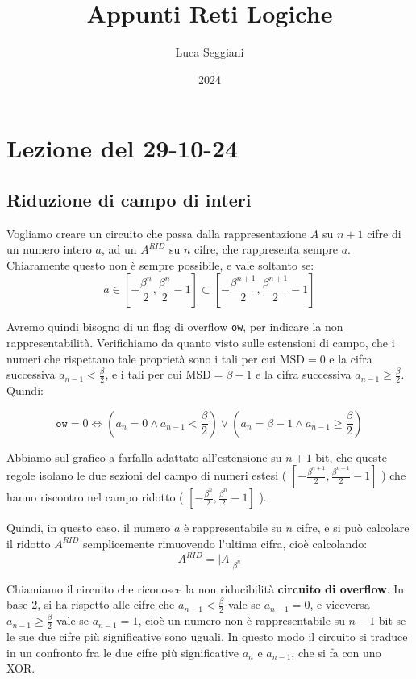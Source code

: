 \documentclass[a4paper,11pt]{article}
\title{Appunti Reti Logiche}
\author{Luca Seggiani}
\date{2024}
\begin{document}
\section{Lezione del 29-10-24}

\thispagestyle{empty}
\pagestyle{fancy}

\subsection{Riduzione di campo di interi}
Vogliamo creare un circuito che passa dalla rappresentazione $A$ su $n+1$ cifre di un numero intero $a$, ad un $A^{RID}$ su $n$ cifre, che rappresenta sempre $a$. 
Chiaramente questo non è sempre possibile, e vale soltanto se:
$$
a \in \left[ -\frac{\beta^n}{2}, \frac{\beta^n}{2} - 1 \right] \subset \left[ -\frac{\beta^{n+1}}{2}, \frac{\beta^{n+1}}{2} - 1 \right]
$$

Avremo quindi bisogno di un flag di overflow \lstinline|ow|, per indicare la non rappresentabilità.
Verifichiamo da quanto visto sulle estensioni di campo, che i numeri che rispettano tale proprietà sono i tali per cui $\text{MSD} = 0$ e la cifra successiva $a_{n-1} < \frac{\beta}{2}$, e i tali per cui $\text{MSD} = \beta - 1$ e la cifra successiva $a_{n-1} \geq \frac{\beta}{2}$. Quindi:

$$
\mathtt{ow} = 0 \Leftrightarrow \left( a_n = 0 \wedge a_{n-1} < \frac{\beta}{2} \right) \vee \left( a_n = \beta - 1 \wedge a_{n-1} \geq \frac{\beta}{2} \right)
$$

Abbiamo sul grafico a farfalla adattato all'estensione su $n+1$ bit, che queste regole isolano le due sezioni del campo di numeri estesi ( $\left[ -\frac{\beta^{n+1}}{2}, \frac{\beta^{n+1}}{2} - 1 \right]$ ) che hanno riscontro nel campo ridotto ( $\left[ -\frac{\beta^n}{2}, \frac{\beta^n}{2} - 1 \right]$ ).

Quindi, in questo caso, il numero $a$ è rappresentabile su $n$ cifre, e si può calcolare il ridotto $A^{RID}$ semplicemente rimuovendo l'ultima cifra, cioè calcolando:
$$
A^{RID} = |A|_{\beta^n}
$$

Chiamiamo il circuito che riconosce la non riducibilità \textbf{circuito di overflow}.
In base 2, si ha rispetto alle cifre che $a_{n-1} < \frac{\beta}{2}$ vale se $a_{n-1} = 0$, e viceversa $a_{n-1} \geq \frac{\beta}{2}$ vale se $a_{n-1} = 1$, cioè un numero non è rappresentabile su $n-1$ bit se le sue due cifre più significative sono uguali. In questo modo il circuito si traduce in un confronto fra le due cifre più significative $a_n$ e $a_{n-1}$, che si fa con uno XOR.
\end{document}
